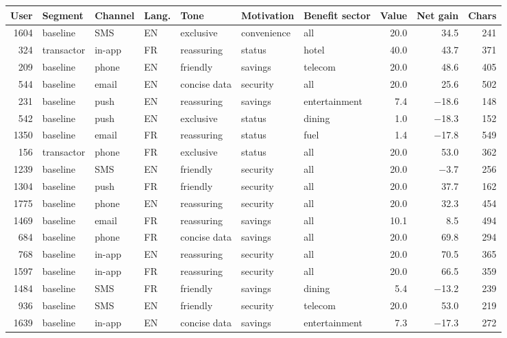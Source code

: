 \documentclass[11pt,a4paper]{article}
\begin{document}
\begin{center}
\scriptsize
\setlength{\tabcolsep}{3.2pt}
\newcommand{\red}[1]{\textcolor{cr}{#1}}
\begin{tabular}{@{}rllllllrrr@{}}
\toprule
\textbf{User} & \textbf{Segment} & \textbf{Channel} & \textbf{Lang.} & \textbf{Tone} & \textbf{Motivation} & \textbf{Benefit sector} & \textbf{Value} & \textbf{Net gain} & \textbf{Chars}\\
\midrule
1604 & baseline & SMS & EN & exclusive & convenience & all & 20.0 & 34.5 & 241\\
324 & transactor & in-app & FR & reassuring & status & hotel & 40.0 & 43.7 & 371\\
209 & baseline & phone & EN & friendly & savings & telecom & 20.0 & 48.6 & 405\\
544 & baseline & email & EN & concise data & security & all & 20.0 & 25.6 & 502\\
231 & baseline & push & EN & reassuring & savings & entertainment & 7.4 & \red{$-$18.6} & 148\\
542 & baseline & push & EN & exclusive & status & dining & 1.0 & \red{$-$18.3} & 152\\
1350 & baseline & email & FR & reassuring & status & fuel & 1.4 & \red{$-$17.8} & 549\\
156 & transactor & phone & FR & exclusive & status & all & 20.0 & 53.0 & 362\\
1239 & baseline & SMS & EN & friendly & security & all & 20.0 & \red{$-$3.7} & 256\\
1304 & baseline & push & FR & friendly & security & all & 20.0 & 37.7 & 162\\
1775 & baseline & phone & EN & reassuring & security & all & 20.0 & 32.3 & 454\\
1469 & baseline & email & FR & reassuring & savings & all & 10.1 & 8.5 & 494\\
684 & baseline & phone & FR & concise data & savings & all & 20.0 & 69.8 & 294\\
768 & baseline & in-app & EN & reassuring & security & all & 20.0 & 70.5 & 365\\
1597 & baseline & in-app & FR & reassuring & security & all & 20.0 & 66.5 & 359\\
1484 & baseline & SMS & FR & friendly & savings & dining & 5.4 & \red{$-$13.2} & 239\\
936 & baseline & SMS & EN & friendly & security & telecom & 20.0 & 53.0 & 219\\
1639 & baseline & in-app & EN & concise data & savings & entertainment & 7.3 & \red{$-$17.3} & 272\\

\end{tabular}
\end{center}
\end{document}

